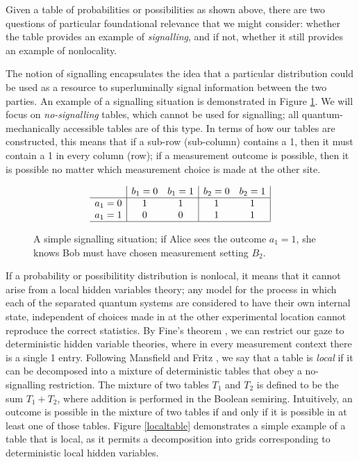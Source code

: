 \documentclass[reprint]{revtex4-1}
\theoremstyle{definition}
\begin{document}
Given a table of probabilities or possibilities as shown above, there are two questions of particular foundational relevance that we might consider: whether the table provides an example of \emph{signalling}, and if not, whether it still provides an example of nonlocality.

The notion of signalling encapsulates the idea that a particular distribution could be used as a resource to superluminally signal information between the two parties. An example of a signalling situation is demonstrated in Figure \ref{sig}. We will focus on \emph{no-signalling} tables, which cannot be used for signalling; all quantum-mechanically accessible tables are of this type. In terms of how our tables are constructed, this means that if a sub-row (sub-column) contains a 1, then it must contain a 1 in every column (row); if a measurement outcome is possible, then it is possible no matter which measurement choice is made at the other site.
\begin{figure}
\begin{equation*}
\begin{array}{c| c c | c c |}
&b_1=0&b_1=1&b_2=0&b_2=1\\ \hline
a_1=0&1 &1  &1 & 1\\
a_1=1&0&0 &1 &1\\ \hline
\end{array} 
\end{equation*}
\caption{A simple signalling situation; if Alice sees the outcome $a_1=1$, she knows Bob must have chosen measurement setting $B_2$.}
\label{sig}
\end{figure}

If a probability or possibilitity distribution is nonlocal, it means that it cannot arise from a local hidden variables theory; any model for the process in which each of the separated quantum systems are considered to have their own internal state, independent of choices made in at the other experimental location cannot reproduce the correct statistics. By Fine's theorem \cite{Fine1982}, we can restrict our gaze to deterministic hidden variable theories, where in every measurement context there is a single 1 entry. Following Mansfield and Fritz \cite{Mans2011}, we say that a table is \emph{local} if it can be decomposed into a mixture of deterministic tables that obey a no-signalling restriction. The mixture of two tables $T_1$ and $T_2$ is defined to be the sum $T_1+T_2$, where addition is performed in the Boolean semiring. Intuitively, an outcome is possible in the mixture of two tables if and only if it is possible in at least one of those tables. Figure \ref{localtable} demonstrates a simple example of a table that is local, as it permits a decomposition into grids corresponding to deterministic local hidden variables.
\end{document}

